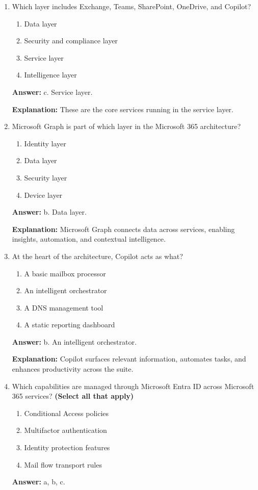 \documentclass[10pt]{article}
\begin{document}
\begin{enumerate}[leftmargin=*]
\textbf{Explanation:} The identity layer depends on Microsoft Entra ID for authentication and access security controls.

\item Which layer includes Exchange, Teams, SharePoint, OneDrive, and Copilot?
\begin{enumerate}[label=\alph*., leftmargin=1.5em]
\item Data layer
\item Security and compliance layer
\item Service layer
\item Intelligence layer
\end{enumerate}
\textbf{Answer:} c. Service layer.

\textbf{Explanation:} These are the core services running in the service layer.

\item Microsoft Graph is part of which layer in the Microsoft 365 architecture?
\begin{enumerate}[label=\alph*., leftmargin=1.5em]
\item Identity layer
\item Data layer
\item Security layer
\item Device layer
\end{enumerate}
\textbf{Answer:} b. Data layer.

\textbf{Explanation:} Microsoft Graph connects data across services, enabling insights, automation, and contextual intelligence.

\item At the heart of the architecture, Copilot acts as what?
\begin{enumerate}[label=\alph*., leftmargin=1.5em]
\item A basic mailbox processor
\item An intelligent orchestrator
\item A DNS management tool
\item A static reporting dashboard
\end{enumerate}
\textbf{Answer:} b. An intelligent orchestrator.

\textbf{Explanation:} Copilot surfaces relevant information, automates tasks, and enhances productivity across the suite.

\item Which capabilities are managed through Microsoft Entra ID across Microsoft 365 services? \textbf{(Select all that apply)}
\begin{enumerate}[label=\alph*., leftmargin=1.5em]
\item Conditional Access policies
\item Multifactor authentication
\item Identity protection features
\item Mail flow transport rules
\end{enumerate}
\textbf{Answer:} a, b, c.


\end{enumerate}
\end{document}
